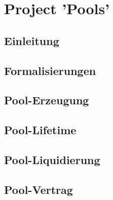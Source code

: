 
\section{Project 'Pools'}
\label{sec:pools}

\subsection{Einleitung}
\label{sec:pools-einleitung}
\vspace{0.3cm}


\subsection{Formalisierungen}
\vspace{0.3cm}


\subsection{Pool-Erzeugung}
\vspace{0.3cm}


\subsection{Pool-Lifetime}
\vspace{0.3cm}


\subsection{Pool-Liquidierung}
\label{sec:pools-liquidierung}
\vspace{0.3cm}


\subsection{Pool-Vertrag}
\vspace{0.3cm}


